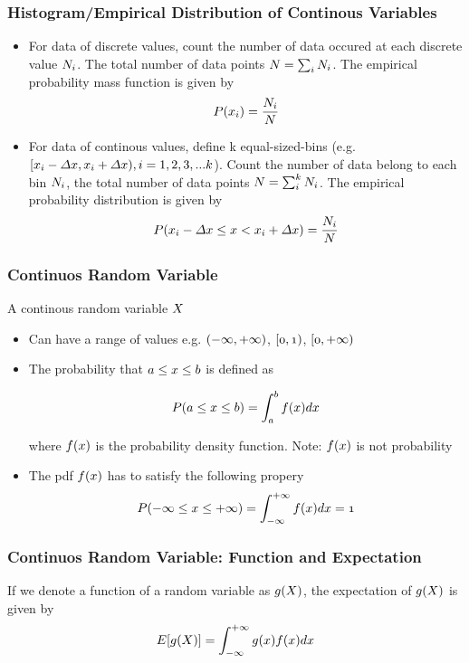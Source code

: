\documentclass[notheorems, aspectratio=54]{beamer}
\begin{document}
\begin{frame}
\frametitle{Histogram/Empirical Distribution of Continous Variables}
\begin{itemize}
\item For data of discrete values, count the number of data occured at each discrete value $\mathnormal{N_i}$. The total number of data points $\mathnormal{N=\sum_{i}N_i}$. The empirical probability mass function is given by $$\mathnormal{P(x_i)=\frac{N_i}{N}}$$
\item For data of continous values, define k equal-sized-bins (e.g. $\mathnormal{[x_i-\Delta x, x_i+\Delta x)}, i=1, 2, 3, ...\mathnormal{k}$). Count the number of data belong to each bin $\mathnormal{N_i}$, the total number of data points $\mathnormal{N=\sum_{i}^{k}N_i}$. The empirical probability distribution is given by $$\mathnormal{P(x_i-\Delta x \leq x < x_i+\Delta x )=\frac{N_i}{N}}$$

\end{itemize}
\end{frame}


\begin{frame}
\frametitle{Continuos Random Variable}

A continous random variable $\mathnormal{X}$
\begin{itemize}
\item Can have a range of values e.g. $\mathnormal{(-\infty, +\infty)}$, $\mathnormal{[0, 1)}$, $\mathnormal{[0, +\infty)}$
\item The probability that $\mathnormal{a\leq x \leq b}$ is defined as 

$$\mathnormal{P(a\leq x \leq b) = \int_{a}^{b} f(x) dx}$$ 

where $\mathnormal{f(x)}$ is the probability density function. Note: $\mathnormal{f(x)}$ is not probability
\item The pdf $\mathnormal{f(x)}$ has to satisfy the following propery $$\mathnormal{P(-\infty \leq x \leq +\infty) = \int_{-\infty }^{+\infty }f(x)dx=1}$$
\end{itemize}

\end{frame}

\begin{frame}
\frametitle{Continuos Random Variable: Function and Expectation}
If we denote a function of a random variable as $\mathnormal{g(X)}$, the expectation of $\mathnormal{g(X)}$ is given by
$$\mathnormal{E[g(X)]=\int_{-\infty }^{+\infty }g(x)f(x)dx}$$

\end{frame}
\end{document}
